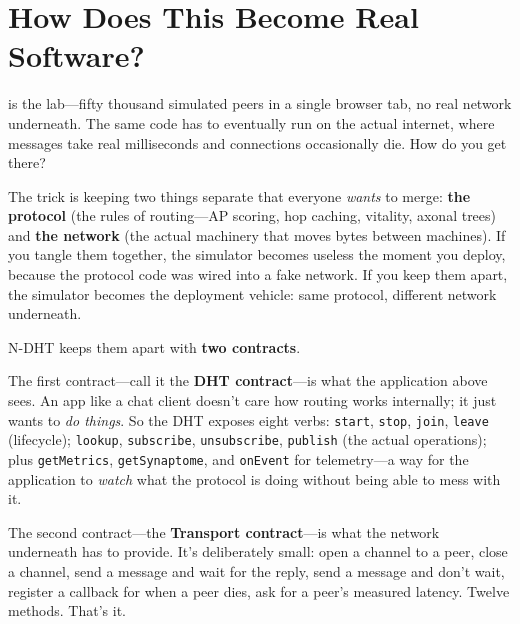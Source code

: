 \documentclass[nobib]{tufte-handout}
\begin{document}
\section{How Does This Become Real Software?}

 is the lab---fifty thousand simulated peers in a single browser tab, no real network underneath. The same code has to eventually run on the actual internet, where messages take real milliseconds and connections occasionally die. How do you get there?

The trick is keeping two things separate that everyone \emph{wants} to merge: \textbf{the protocol} (the rules of routing---AP scoring, hop caching, vitality, axonal trees) and \textbf{the network} (the actual machinery that moves bytes between machines). If you tangle them together, the simulator becomes useless the moment you deploy, because the protocol code was wired into a fake network. If you keep them apart, the simulator becomes the deployment vehicle: same protocol, different network underneath.

N-DHT keeps them apart with \textbf{two contracts}.

The first contract---call it the \textbf{DHT contract}---is what the application above sees. An app like a chat client doesn't care how routing works internally; it just wants to \emph{do things}. So the DHT exposes eight verbs: \texttt{start}, \texttt{stop}, \texttt{join}, \texttt{leave} (lifecycle); \texttt{lookup}, \texttt{subscribe}, \texttt{unsubscribe}, \texttt{publish} (the actual operations); plus \texttt{getMetrics}, \texttt{getSynaptome}, and \texttt{onEvent} for telemetry---a way for the application to \emph{watch} what the protocol is doing without being able to mess with it.

The second contract---the \textbf{Transport contract}---is what the network underneath has to provide. It's deliberately small: open a channel to a peer, close a channel, send a message and wait for the reply, send a message and don't wait, register a callback for when a peer dies, ask for a peer's measured latency. Twelve methods. That's it.
\end{document}
